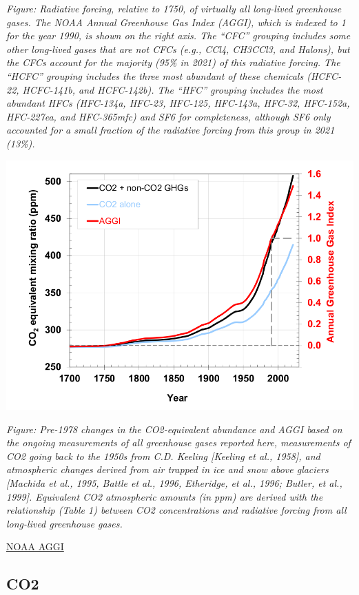 \documentclass[
]{book}
\begin{document}
\emph{Figure: Radiative forcing, relative to 1750, of virtually all long-lived greenhouse gases. The NOAA Annual Greenhouse Gas Index (AGGI), which is indexed to 1 for the year 1990, is shown on the right axis. The ``CFC\emph{'' grouping includes some other long-lived gases that are not CFCs (e.g., CCl4, CH3CCl3, and Halons), but the CFCs account for the majority (95\% in 2021) of this radiative forcing. The ``HCFC'' grouping includes the three most abundant of these chemicals (HCFC-22, HCFC-141b, and HCFC-142b). The ``HFC}'' grouping includes the most abundant HFCs (HFC-134a, HFC-23, HFC-125, HFC-143a, HFC-32, HFC-152a, HFC-227ea, and HFC-365mfc) and SF6 for completeness, although SF6 only accounted for a small fraction of the radiative forcing from this group in 2021 (13\%). }

\includegraphics{fig/noaa_aggi.fig4.png}

\emph{Figure: Pre-1978 changes in the CO2-equivalent abundance and AGGI based on the ongoing measurements of all greenhouse gases reported here, measurements of CO2 going back to the 1950s from C.D. Keeling {[}Keeling et al., 1958{]}, and atmospheric changes derived from air trapped in ice and snow above glaciers {[}Machida et al., 1995, Battle et al., 1996, Etheridge, et al., 1996; Butler, et al., 1999{]}. Equivalent CO2 atmospheric amounts (in ppm) are derived with the relationship (Table 1) between CO2 concentrations and radiative forcing from all long-lived greenhouse gases. }

\href{https://gml.noaa.gov/aggi/aggi.html}{NOAA AGGI}

\hypertarget{co2}{%
\subsection{CO2}\label{co2}}
\end{document}
